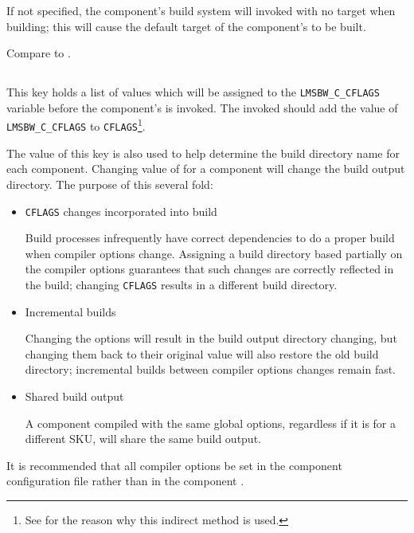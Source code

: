 If not specified, the component's build system will invoked with no
target when building; this will cause the default target of the
component's \makefile to be built.

Compare to .


\subsection{}\label{variables:cflags}

This key holds a list of values which will be assigned to the
\texttt{LMSBW\_C\_CFLAGS} variable before the component's \makefile is
invoked.  The invoked \makefile should add the value of
\texttt{LMSBW\_C\_CFLAGS} to \texttt{CFLAGS}\footnote{See
   for the reason why this indirect method is used.}.

The value of this key is also used to help determine the build
directory name for each component.  Changing value of
 for a component will change the build
output directory. The purpose of this several fold:

\begin{itemize}
\item \texttt{CFLAGS} changes incorporated into build

  Build processes infrequently have correct dependencies to do a
  proper build when compiler options change.  Assigning a build
  directory based partially on the compiler options guarantees that
  such changes are correctly reflected in the build; changing
  \texttt{CFLAGS} results in a different build directory.

\item Incremental builds

  Changing the options will result in the build output directory
  changing, but changing them back to their original value will also
  restore the old build directory; incremental builds between compiler
  options changes remain fast.

\item Shared build output

  A component compiled with the same global options, regardless if it
  is for a different SKU, will share the same build output.
\end{itemize}

It is recommended that all compiler options be set in the component
configuration file rather than in the component \makefile.


